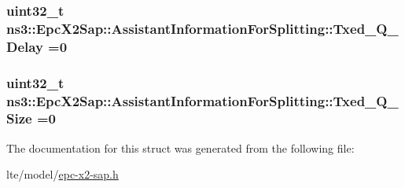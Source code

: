 \subsubsection[{\texorpdfstring{Txed\+\_\+\+Q\+\_\+\+Delay}{Txed_Q_Delay}}]{\setlength{\rightskip}{0pt plus 5cm}uint32\+\_\+t ns3\+::\+Epc\+X2\+Sap\+::\+Assistant\+Information\+For\+Splitting\+::\+Txed\+\_\+\+Q\+\_\+\+Delay =0}\hypertarget{structns3_1_1EpcX2Sap_1_1AssistantInformationForSplitting_aa1ab73d0ac5735b2bf9573220b782199}{}\label{structns3_1_1EpcX2Sap_1_1AssistantInformationForSplitting_aa1ab73d0ac5735b2bf9573220b782199}
\subsubsection[{\texorpdfstring{Txed\+\_\+\+Q\+\_\+\+Size}{Txed_Q_Size}}]{\setlength{\rightskip}{0pt plus 5cm}uint32\+\_\+t ns3\+::\+Epc\+X2\+Sap\+::\+Assistant\+Information\+For\+Splitting\+::\+Txed\+\_\+\+Q\+\_\+\+Size =0}\hypertarget{structns3_1_1EpcX2Sap_1_1AssistantInformationForSplitting_ac3e1f8f1f070e4caf1afd55a7a2b77d9}{}\label{structns3_1_1EpcX2Sap_1_1AssistantInformationForSplitting_ac3e1f8f1f070e4caf1afd55a7a2b77d9}


The documentation for this struct was generated from the following file\+:\begin{DoxyCompactItemize}
\item 
lte/model/\hyperlink{epc-x2-sap_8h}{epc-\/x2-\/sap.\+h}\end{DoxyCompactItemize}
